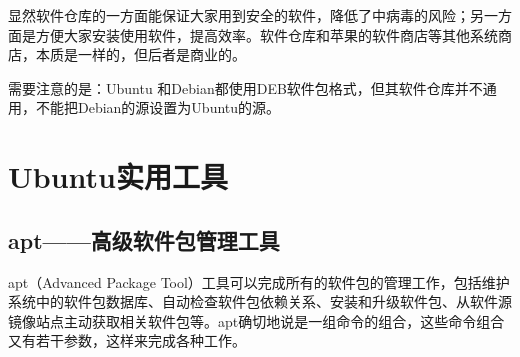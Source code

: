 显然软件仓库的一方面能保证大家用到安全的软件，降低了中病毒的风险；另一方面是方便大家安装使用软件，提高效率。软件仓库和苹果的软件商店等其他系统商店，本质是一样的，但后者是商业的。

需要注意的是：Ubuntu 和Debian都使用DEB软件包格式，但其软件仓库并不通用，不能把Debian的源设置为Ubuntu的源。


\section{Ubuntu实用工具}
\subsection{apt——高级软件包管理工具}
apt（Advanced Package Tool）工具可以完成所有的软件包的管理工作，包括维护系统中的软件包数据库、自动检查软件包依赖关系、安装和升级软件包、从软件源镜像站点主动获取相关软件包等。apt确切地说是一组命令的组合，这些命令组合又有若干参数，这样来完成各种工作。
